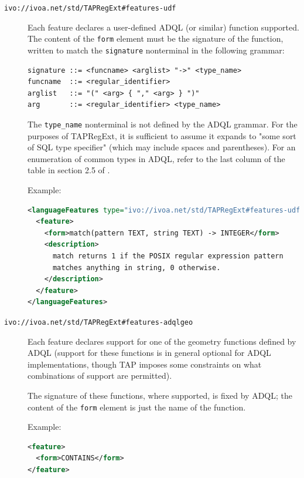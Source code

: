 \documentclass{ivoa}
\begin{document}
\begin{description}
\item[\nolinkurl{ivo://ivoa.net/std/TAPRegExt\#features-udf}] Each feature declares a user-defined ADQL (or similar) function supported.
    The content of the \texttt{form} element
    must be the signature of the function, written to match the
    \texttt{signature} nonterminal in the following grammar:


\begin{verbatim}
signature ::= <funcname> <arglist> "->" <type_name>
funcname  ::= <regular_identifier>
arglist   ::= "(" <arg> { "," <arg> } ")"
arg       ::= <regular_identifier> <type_name>
\end{verbatim}

The \texttt{type\_name} nonterminal is not defined by the ADQL
		grammar. For the purposes of TAPRegExt, it is sufficient to assume
		it expands to "some sort of SQL type specifier" (which may
		include spaces and parentheses).  For an enumeration of common types
		in ADQL, refer to the last column of the table in section 2.5 of 
		\citep{std:TAP}.

Example:


\begin{lstlisting}[language=XML]
<languageFeatures type="ivo://ivoa.net/std/TAPRegExt#features-udf">
  <feature>
    <form>match(pattern TEXT, string TEXT) -> INTEGER</form>
    <description>
      match returns 1 if the POSIX regular expression pattern 
      matches anything in string, 0 otherwise.
    </description>
  </feature>
</languageFeatures>
\end{lstlisting}


\item[\nolinkurl{ivo://ivoa.net/std/TAPRegExt\#features-adqlgeo}] Each feature declares support for one of the geometry functions 
		defined by ADQL
    (support for these functions is in general optional for ADQL
    implementations, though TAP imposes some constraints on what 
    combinations of support are permitted).

The signature of these functions, where supported, is fixed by ADQL;
    the content of the \texttt{form} element
    is just the name of the function.

Example:


\begin{lstlisting}[language=XML]
<feature>
  <form>CONTAINS</form>
</feature>
\end{lstlisting}



\end{description}
\end{document}
